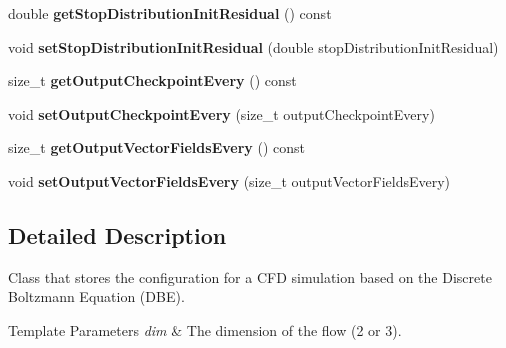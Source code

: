 \begin{DoxyCompactItemize}
\item 
\hypertarget{classnatrium_1_1SolverConfiguration_a26e733da8edd36afa784a19141dfa11e}{double {\bfseries get\-Stop\-Distribution\-Init\-Residual} () const }\label{classnatrium_1_1SolverConfiguration_a26e733da8edd36afa784a19141dfa11e}

\item 
\hypertarget{classnatrium_1_1SolverConfiguration_ad9689ce7a643360688906af1725f9105}{void {\bfseries set\-Stop\-Distribution\-Init\-Residual} (double stop\-Distribution\-Init\-Residual)}\label{classnatrium_1_1SolverConfiguration_ad9689ce7a643360688906af1725f9105}

\item 
\hypertarget{classnatrium_1_1SolverConfiguration_a00d3f2d230004ae0043c317222a8822e}{size\-\_\-t {\bfseries get\-Output\-Checkpoint\-Every} () const }\label{classnatrium_1_1SolverConfiguration_a00d3f2d230004ae0043c317222a8822e}

\item 
\hypertarget{classnatrium_1_1SolverConfiguration_a3d33552c3a6fb7cbdef3d63a739e5228}{void {\bfseries set\-Output\-Checkpoint\-Every} (size\-\_\-t output\-Checkpoint\-Every)}\label{classnatrium_1_1SolverConfiguration_a3d33552c3a6fb7cbdef3d63a739e5228}

\item 
\hypertarget{classnatrium_1_1SolverConfiguration_ab4da4ef57be63ec9c38d3f1d09d62402}{size\-\_\-t {\bfseries get\-Output\-Vector\-Fields\-Every} () const }\label{classnatrium_1_1SolverConfiguration_ab4da4ef57be63ec9c38d3f1d09d62402}

\item 
\hypertarget{classnatrium_1_1SolverConfiguration_a05d21fe7e83132ce9d216df3ff0e1e16}{void {\bfseries set\-Output\-Vector\-Fields\-Every} (size\-\_\-t output\-Vector\-Fields\-Every)}\label{classnatrium_1_1SolverConfiguration_a05d21fe7e83132ce9d216df3ff0e1e16}

\end{DoxyCompactItemize}


\subsection{Detailed Description}
Class that stores the configuration for a C\-F\-D simulation based on the Discrete Boltzmann Equation (D\-B\-E). 


\begin{DoxyTemplParams}{Template Parameters}
{\em dim} & The dimension of the flow (2 or 3). \\
\hline
\end{DoxyTemplParams}


